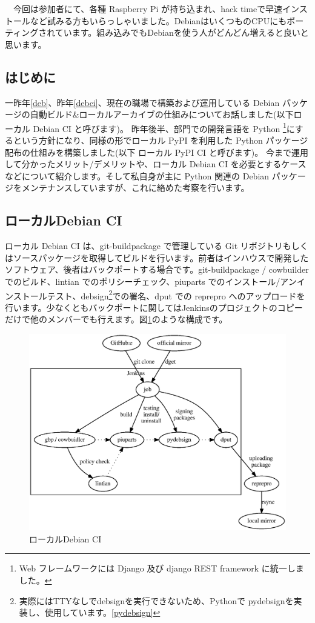 \documentclass[mingoth,a4paper]{jsarticle}
\begin{document}
　今回は参加者にて、各種 Raspberry Pi が持ち込まれ、hack timeで早速インストールなど試みる方もいらっしゃいました。DebianはいくつものCPUにもポーティングされています。組み込みでもDebianを使う人がどんどん増えると良いと思います。
 

\subsection{はじめに}

一昨年\ref{deb}、昨年\ref{debci}、現在の職場で構築および運用している Debian パッケージの自動ビルド\&ローカルアーカイブの仕組みについてお話しました(以下ローカル Debian CI と呼びます)。
昨年後半、部門での開発言語を Python \footnote{Web フレームワークには Django 及び django REST framework に統一しました。}にするという方針になり、同様の形でローカル PyPI を利用した Python パッケージ配布の仕組みを構築しました(以下 ローカル PyPI CI と呼びます)。
今まで運用して分かったメリット/デメリットや、ローカル Debian CI を必要とするケースなどについて紹介します。そして私自身が主に Python 関連の Debian パッケージをメンテナンスしていますが、これに絡めた考察を行います。

\subsection{ローカルDebian CI}

ローカル Debian CI は、git-buildpackage で管理している Git リポジトリもしくはソースパッケージを取得してビルドを行います。前者はインハウスで開発したソフトウェア、後者はバックポートする場合です。git-buildpackage / cowbuilder でのビルド、lintian でのポリシーチェック、piuparts でのインストール/アンインストールテスト、debsign\footnote{実際にはTTYなしでdebsignを実行できないため、Pythonで pydebsignを実装し、使用しています。\ref{pydebsign}}での署名、dput での reprepro へのアップロードを行います。少なくともバックポートに関してはJenkinsのプロジェクトのコピーだけで他のメンバーでも行えます。図\ref{fig:debian-ci}のような構成です。

\begin{figure}[htbp]
  \begin{center}
  \includegraphics[width=0.50\hsize]{image201504/debian-ci.eps}
  \caption{ローカルDebian CI}
  \label{fig:debian-ci}
  \end{center}
\end{figure}
\end{document}
